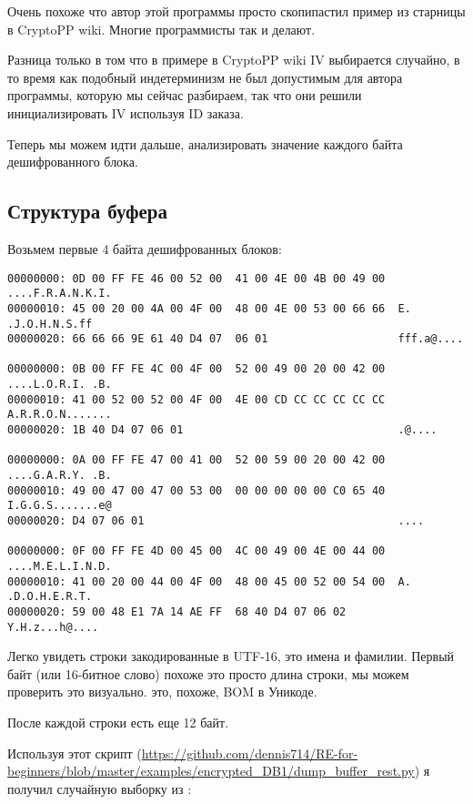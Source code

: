 Очень похоже что автор этой программы просто скопипастил пример из старницы в CryptoPP wiki.
Многие программисты так и делают.

Разница только в том что в примере в CryptoPP wiki \ac{IV} выбирается случайно, в то время как подобный индетерминизм
не был допустимым для автора программы, которую мы сейчас разбираем,
так что они решили инициализировать \ac{IV} используя ID заказа.

Теперь мы можем идти дальше, анализировать значение каждого байта дешифрованного блока.

\subsection{Структура буфера}

Возьмем первые 4 байта дешифрованных блоков:

\begin{lstlisting}
00000000: 0D 00 FF FE 46 00 52 00  41 00 4E 00 4B 00 49 00  ....F.R.A.N.K.I.
00000010: 45 00 20 00 4A 00 4F 00  48 00 4E 00 53 00 66 66  E. .J.O.H.N.S.ff
00000020: 66 66 66 9E 61 40 D4 07  06 01                    fff.a@....

00000000: 0B 00 FF FE 4C 00 4F 00  52 00 49 00 20 00 42 00  ....L.O.R.I. .B.
00000010: 41 00 52 00 52 00 4F 00  4E 00 CD CC CC CC CC CC  A.R.R.O.N.......
00000020: 1B 40 D4 07 06 01                                 .@....

00000000: 0A 00 FF FE 47 00 41 00  52 00 59 00 20 00 42 00  ....G.A.R.Y. .B.
00000010: 49 00 47 00 47 00 53 00  00 00 00 00 00 C0 65 40  I.G.G.S.......e@
00000020: D4 07 06 01                                       ....

00000000: 0F 00 FF FE 4D 00 45 00  4C 00 49 00 4E 00 44 00  ....M.E.L.I.N.D.
00000010: 41 00 20 00 44 00 4F 00  48 00 45 00 52 00 54 00  A. .D.O.H.E.R.T.
00000020: 59 00 48 E1 7A 14 AE FF  68 40 D4 07 06 02        Y.H.z...h@....
\end{lstlisting}

Легко увидеть строки закодированные в UTF-16, это имена и фамилии.
Первый байт (или 16-битное слово) похоже это просто длина строки, мы можем проверить это визуально.
 это, похоже, \ac{BOM} в Уникоде.

После каждой строки есть еще 12 байт.

Используя этот скрипт 
(\url{https://github.com/dennis714/RE-for-beginners/blob/master/examples/encrypted_DB1/dump_buffer_rest.py})
я получил случайную выборку из :


